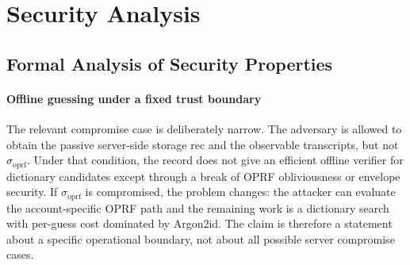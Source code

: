 \documentclass[preprint,12pt]{elsarticle}
\newcommand{\sigoprf}{\sigma_{\mathrm{oprf}}}
\theoremstyle{remark}
\begin{document}
\section{Security Analysis}

\subsection{Formal Analysis of Security Properties}

\paragraph{Offline guessing under a fixed trust boundary}
The relevant compromise case is deliberately narrow. The adversary is
allowed to obtain the passive server-side storage $\mathrm{rec}$ and the
observable transcripts, but not $\sigoprf$. Under that condition, the
record does not give an efficient offline verifier for dictionary
candidates except through a break of OPRF obliviousness or envelope
security. If $\sigoprf$ is compromised, the problem changes: the attacker
can evaluate the account-specific OPRF path and the remaining work is a
dictionary search with per-guess cost dominated by Argon2id. The claim is
therefore a statement about a specific operational boundary, not about
all possible server compromise cases.
\end{document}
